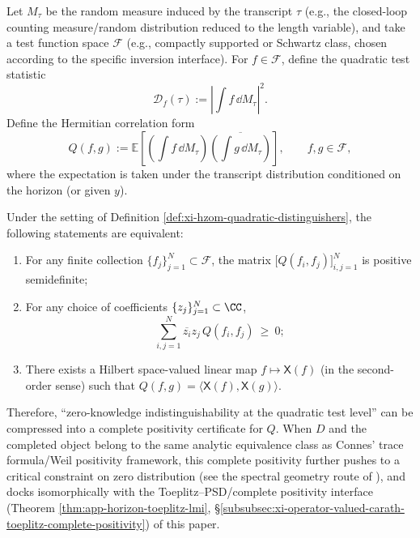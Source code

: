 \begin{definition}\label{def:xi-hzom-quadratic-distinguishers}
Let \(M_{\tau}\) be the random measure induced by the transcript \(\tau\) (e.g., the closed-loop counting measure/random distribution reduced to the length variable), and take a test function space \(\mathcal{F}\) (e.g., compactly supported or Schwartz class, chosen according to the specific inversion interface).
For \(f\in\mathcal{F}\), define the quadratic test statistic
\[
\mathcal{D}_{f}(\tau):=\left|\int f\,\dd M_{\tau}\right|^{2}.
\]
Define the Hermitian correlation form
\[
Q(f,g):=\mathbb{E}\!\left[\left(\int f\,\dd M_{\tau}\right)\overline{\left(\int g\,\dd M_{\tau}\right)}\right],
\qquad f,g\in\mathcal{F},
\]
where the expectation is taken under the transcript distribution conditioned on the horizon (or given \(y\)).
\end{definition}

\begin{proposition}\label{prop:xi-hzom-weil-positivity-cp}
Under the setting of Definition \ref{def:xi-hzom-quadratic-distinguishers}, the following statements are equivalent:
\begin{enumerate}
  \item For any finite collection \(\{f_j\}_{j=1}^{N}\subset\mathcal{F}\), the matrix \(\bigl[Q(f_i,f_j)\bigr]_{i,j=1}^{N}\) is positive semidefinite;
  \item For any choice of coefficients \(\{z_j\}_{j=1}^{N}\subset\CC\),
  \[
  \sum_{i,j=1}^{N}\overline{z_i}z_j\,Q(f_i,f_j)\ \ge\ 0;
  \]
  \item There exists a Hilbert space-valued linear map \(f\mapsto \mathsf{X}(f)\) (in the second-order sense) such that \(Q(f,g)=\langle \mathsf{X}(f),\mathsf{X}(g)\rangle\).
\end{enumerate}
Therefore, ``zero-knowledge indistinguishability at the quadratic test level'' can be compressed into a complete positivity certificate for \(Q\).
When \(D\) and the completed object belong to the same analytic equivalence class as Connes' trace formula/Weil positivity framework, this complete positivity further pushes to a critical constraint on zero distribution (see the spectral geometry route of \cite{Connes1999TraceFormulaNCG}), and docks isomorphically with the Toeplitz--PSD/complete positivity interface (Theorem \ref{thm:app-horizon-toeplitz-lmi}, \S\ref{subsubsec:xi-operator-valued-carath-toeplitz-complete-positivity}) of this paper.
\end{proposition}

